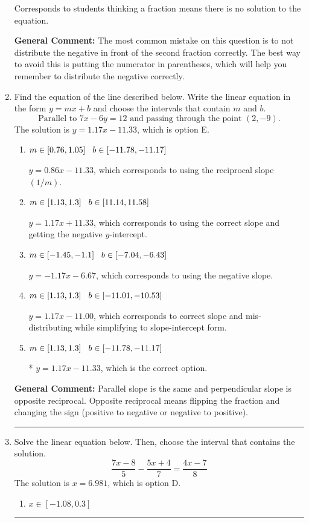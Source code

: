 \documentclass{extbook}[14pt]
\newcommand{\litem}[1]{\item #1

\rule{\textwidth}{0.4pt}}
\begin{document}
\begin{enumerate}
{\begin{enumerate}[label=\Alph*.]
Corresponds to students thinking a fraction means there is no solution to the equation.
\end{enumerate}

\textbf{General Comment:} The most common mistake on this question is to not distribute the negative in front of the second fraction correctly. The best way to avoid this is putting the numerator in parentheses, which will help you remember to distribute the negative correctly.
}
\litem{
Find the equation of the line described below. Write the linear equation in the form $ y=mx+b $ and choose the intervals that contain $m$ and $b$.
\[ \text{Parallel to } 7 x - 6 y = 12 \text{ and passing through the point } (2, -9). \]The solution is \( y = 1.17x - 11.33 \), which is option E.\begin{enumerate}[label=\Alph*.]
\item \( m \in [0.76, 1.05] \hspace*{3mm} b \in [-11.78, -11.17] \)

 $y = 0.86x - 11.33$, which corresponds to using the reciprocal slope $(1/m)$.
\item \( m \in [1.13, 1.3] \hspace*{3mm} b \in [11.14, 11.58] \)

 $y = 1.17x + 11.33$, which corresponds to using the correct slope and getting the negative $y$-intercept.
\item \( m \in [-1.45, -1.1] \hspace*{3mm} b \in [-7.04, -6.43] \)

 $y = -1.17x - 6.67$, which corresponds to using the negative slope.
\item \( m \in [1.13, 1.3] \hspace*{3mm} b \in [-11.01, -10.53] \)

 $y = 1.17x - 11.00$, which corresponds to correct slope and mis-distributing while simplifying to slope-intercept form.
\item \( m \in [1.13, 1.3] \hspace*{3mm} b \in [-11.78, -11.17] \)

* $y = 1.17x - 11.33$, which is the correct option.
\end{enumerate}

\textbf{General Comment:} Parallel slope is the same and perpendicular slope is opposite reciprocal. Opposite reciprocal means flipping the fraction and changing the sign (positive to negative or negative to positive).
}
\litem{
Solve the linear equation below. Then, choose the interval that contains the solution.
\[ \frac{7x -8}{5} - \frac{5x + 4}{7} = \frac{4x -7}{8} \]The solution is \( x = 6.981 \), which is option D.\begin{enumerate}[label=\Alph*.]
\item \( x \in [-1.08, 0.3] \)


\end{enumerate}}
\end{enumerate}
\end{document}
